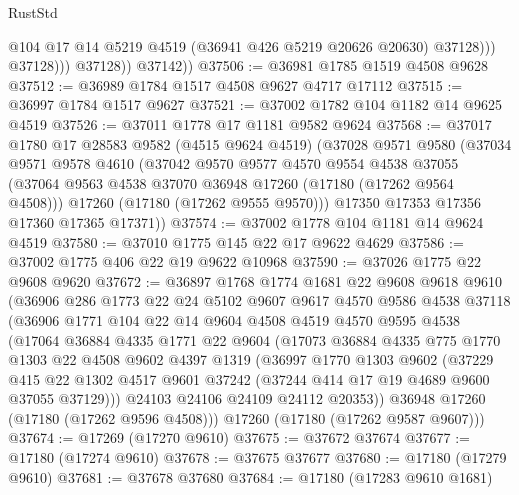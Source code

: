 \begin{lexlean}{RustStd}
\begin{coremodule}
                        @104
                        @17
                        @14
                        @5219
                        @4519
                        (@36941 @426 @5219 @20626 @20630)
                        @37128)))
                  @37128)))
            @37128))
        @37142))
@37506 := @36981 @1785 @1519 @4508 @9628
@37512 := @36989 @1784 @1517 @4508 @9627 @4717 @17112
@37515 := @36997 @1784 @1517 @9627
@37521 := @37002 @1782 @104 @1182 @14 @9625 @4519
@37526 := @37011 @1778 @17 @1181 @9582 @9624
@37568 := @37017
    @1780
    @17
    @28583
    @9582
    (@4515 @9624 @4519)
    (@37028
      @9571
      @9580
      (@37034
        @9571
        @9578
        @4610
        (@37042
          @9570
          @9577
          @4570
          @9554
          @4538
          @37055
          (@37064 @9563 @4538 @37070 @36948 @17260 (@17180 (@17262 @9564 @4508)))
          @17260
          (@17180 (@17262 @9555 @9570)))
        @17350
        @17353
        @17356
        @17360
        @17365
        @17371))
@37574 := @37002 @1778 @104 @1181 @14 @9624 @4519
@37580 := @37010 @1775 @145 @22 @17 @9622 @4629
@37586 := @37002 @1775 @406 @22 @19 @9622 @10968
@37590 := @37026 @1775 @22 @9608 @9620
@37672 := @36897
    @1768
    @1774
    @1681
    @22
    @9608
    @9618
    @9610
    (@36906
      @286
      @1773
      @22
      @24
      @5102
      @9607
      @9617
      @4570
      @9586
      @4538
      @37118
      (@36906
        @1771
        @104
        @22
        @14
        @9604
        @4508
        @4519
        @4570
        @9595
        @4538
        (@17064
          @36884
          @4335
          @1771
          @22
          @9604
          (@17073
            @36884
            @4335
            @775
            @1770
            @1303
            @22
            @4508
            @9602
            @4397
            @1319
            (@36997
              @1770
              @1303
              @9602
              (@37229
                @415
                @22
                @1302
                @4517
                @9601
                @37242
                (@37244 @414 @17 @19 @4689 @9600 @37055 @37129)))
            @24103
            @24106
            @24109
            @24112
            @20353))
        @36948
        @17260
        (@17180 (@17262 @9596 @4508)))
      @17260
      (@17180 (@17262 @9587 @9607)))
@37674 := @17269 (@17270 @9610)
@37675 := @37672 @37674
@37677 := @17180 (@17274 @9610)
@37678 := @37675 @37677
@37680 := @17180 (@17279 @9610)
@37681 := @37678 @37680
@37684 := @17180 (@17283 @9610 @1681)

\end{coremodule}
\end{lexlean}
